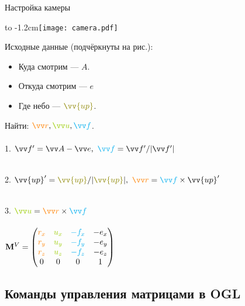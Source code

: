\documentclass[10pt]{beamer}
\begin{document}
	\begin{frame} {Настройка камеры}
		
	{
		\hbox to -1.2cm{}\texttt{[image: camera.pdf]}
	}
	{
		Исходные данные (подчёркнуты на рис.):
		\begin{itemize}
			\item Куда смотрим --- $A$.
			\item Откуда смотрим --- $e$
			\item Где небо --- ${\color{olive}\vv {up}}$.
		\end{itemize}
		Найти:  $	{\color{orange}\vv r},
		{\color{lime!80!black} \vv u} , 
		{\color{cyan} \vv f} $. \\ ~ \\
		
		
		1. $\vv f' = \vv A - \vv e,\ {\color{cyan} \vv f }= \vv f' / |\vv f'|$ \\ ~ \\ \pause
		
		2. $\vv{up}' = {\color{olive}\vv {up}} / |{\color{olive}\vv {up}}|, \ {\color{orange}\vv r} = {\color{cyan} \vv f }\times \vv {up}'$ \\ ~ \\ \pause
		
		3. ${\color{lime!80!black}\vv u} = {\color{orange}\vv r} \times {\color{cyan}\vv f}$ \\ ~ \\ 
		
		$\mathbf M^V = 
		\begin{pmatrix}
			{\color{orange}r_x} & {\color{lime!80!black}u_x} & {\color{cyan}-f_x}& -e_x \\
			{\color{orange}r_y} & {\color{lime!80!black}u_y} & {\color{cyan}-f_y}& -e_y \\
			{\color{orange}r_z} & {\color{lime!80!black}u_z} & {\color{cyan}-f_z}& -e_z \\
			0&0&0&1
		\end{pmatrix}$
		
	}
		
	\end{frame}
	
	\subsection{Команды управления матрицами в OGL}
	
\end{document}
